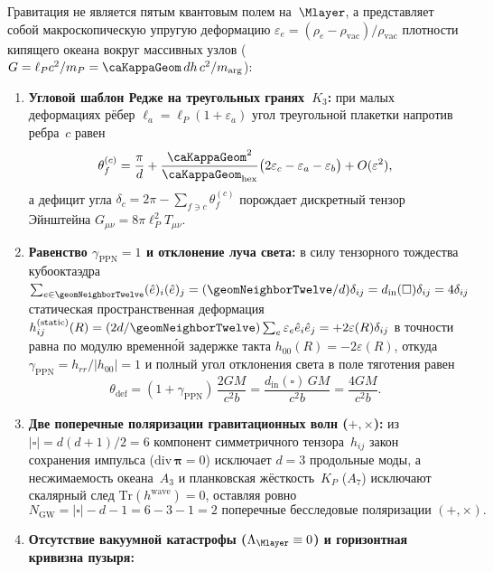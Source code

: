 \begin{proposition}[Гравитационный канал: деформация Редже, отклонение света $\theta_{\mathrm{def}}=4GM/(c^2 b)$, две поляризации и масштаб $\Lambda$]
\label{rem:channel-gr-open-in-book}
Гравитация не является пятым квантовым полем на~$\Mlayer$, а представляет собой макроскопическую упругую деформацию $\varepsilon_e = (\rho_e - \rho_{\mathrm{vac}})/\rho_{\mathrm{vac}}$ плотности кипящего океана вокруг массивных узлов ($G = \ell_P c^2/m_P = \caKappaGeom\,dh\,c^2/m_{\arg}$):
\begin{enumerate}[noitemsep]
\item \textbf{Угловой шаблон Редже на треугольных гранях~$K_3$:}
  при малых деформациях рёбер $\ell_a = \ell_P(1+\varepsilon_a)$ угол треугольной плакетки напротив ребра~$c$ равен
  \[
    \theta_f^{(c)} = \frac{\pi}{d} + \frac{\caKappaGeom^2}{\caKappaGeom_{\mathrm{hex}}}\bigl(2\varepsilon_c - \varepsilon_a - \varepsilon_b\bigr) + O(\varepsilon^2),
  \]
  а дефицит угла $\delta_c = 2\pi - \sum_{f\ni c}\theta_f^{(c)}$ порождает дискретный тензор Эйнштейна $G_{\mu\nu} = 8\pi\ell_P^2 T_{\mu\nu}$.
\item \textbf{Равенство $\gamma_{\mathrm{PPN}} = 1$ и отклонение луча света:}
  в силу тензорного тождества кубооктаэдра $\sum_{e\in\geomNeighborTwelve}(\hat e)_i(\hat e)_j = (\geomNeighborTwelve/d)\delta_{ij} = d_{\mathrm{in}}(\square)\delta_{ij} = 4\delta_{ij}$ статическая пространственная деформация $h_{ij}^{(\mathrm{static})}(R) = (2d/\geomNeighborTwelve)\sum_e\varepsilon_e\hat e_i\hat e_j = +2\varepsilon(R)\delta_{ij}$ в точности равна по модулю временно́й задержке такта $h_{00}(R) = -2\varepsilon(R)$, откуда $\gamma_{\mathrm{PPN}} = h_{rr}/|h_{00}| = 1$ и полный угол отклонения света в поле тяготения равен
  \[
    \theta_{\mathrm{def}} = (1 + \gamma_{\mathrm{PPN}})\,\frac{2GM}{c^2 b} = \frac{d_{\mathrm{in}}(\square)\,GM}{c^2 b} = \frac{4GM}{c^2 b}.
  \]
\item \textbf{Две поперечные поляризации гравитационных волн ($+,\times$):}
  из $|\square| = d(d+1)/2 = 6$ компонент симметричного тензора~$h_{ij}$ закон сохранения импульса ($\mathrm{div}\,\boldsymbol{\pi}=0$) исключает $d=3$ продольные моды, а несжимаемость океана~$A_3$ и планковская жёсткость~$K_P$ ($A_7$) исключают скалярный след $\mathrm{Tr}(h^{\mathrm{wave}})=0$, оставляя ровно
  \[
    N_{\mathrm{GW}} = |\square| - d - 1 = 6 - 3 - 1 = 2\text{ поперечные бесследовые поляризации }(+,\times).
  \]
\item \textbf{Отсутствие вакуумной катастрофы ($\Lambda_{\Mlayer}\equiv 0$) и горизонтная кривизна пузыря:}

\end{enumerate}
\end{proposition}
